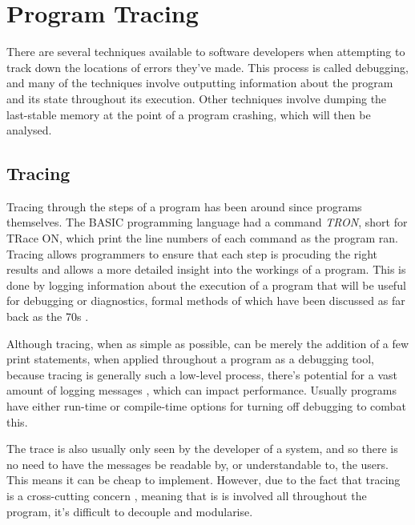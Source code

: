 \documentclass{UoYCSproject}
\begin{document}




\section{Program Tracing}
There are several techniques available to software developers when attempting to track down the locations of errors they've made. This process is called debugging, and many of the techniques involve outputting information about the program and its state throughout its execution. Other techniques involve dumping the last-stable memory at the point of a program crashing, which will then be analysed. 

\subsection{Tracing}
Tracing through the steps of a program has been around since programs themselves. The BASIC programming language had a command \emph{TRON}, short for TRace ON, which print the line numbers of each command as the program ran. 
Tracing allows programmers to ensure that each step is procuding the right results and allows a more detailed insight into the workings of a program. This is done by logging information about the execution of a program that will be useful for debugging or diagnostics, formal methods of which have been discussed as far back as the 70s \cite{psych_debug, code_walkthroughs}.

Although tracing, when as simple as possible, can be merely the addition of a few print statements, when applied throughout a program as a debugging tool, because tracing is generally such a low-level process, there's potential for a vast amount of logging messages \cite{}, which can impact performance. Usually programs have either run-time or compile-time options for turning off debugging to combat this. %

The trace is also usually only seen by the developer of a system, and so there is no need to have the messages be readable by, or understandable to, the users. This means it can be cheap to implement. However, due to the fact that tracing is a cross-cutting concern \cite{}, meaning that is is involved all throughout the program, it's difficult to decouple and modularise. %
\end{document}
